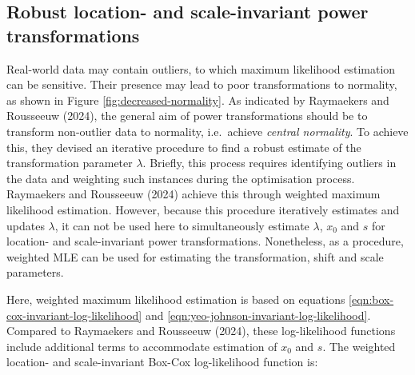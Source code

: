 \documentclass[
  a4paper,
]{article}
\begin{document}
\subsection{Robust location- and scale-invariant power
transformations}\label{robust-location--and-scale-invariant-power-transformations}

Real-world data may contain outliers, to which maximum likelihood
estimation can be sensitive. Their presence may lead to poor
transformations to normality, as shown in Figure
\ref{fig:decreased-normality}. As indicated by Raymaekers and Rousseeuw
(2024), the general aim of power transformations should be to transform
non-outlier data to normality, i.e.~achieve \emph{central normality}. To
achieve this, they devised an iterative procedure to find a robust
estimate of the transformation parameter \(\lambda\). Briefly, this
process requires identifying outliers in the data and weighting such
instances during the optimisation process. Raymaekers and Rousseeuw
(2024) achieve this through weighted maximum likelihood estimation.
However, because this procedure iteratively estimates and updates
\(\lambda\), it can not be used here to simultaneously estimate
\(\lambda\), \(x_0\) and \(s\) for location- and scale-invariant power
transformations. Nonetheless, as a procedure, weighted MLE can be used
for estimating the transformation, shift and scale parameters.

Here, weighted maximum likelihood estimation is based on equations
\ref{eqn:box-cox-invariant-log-likelihood} and
\ref{eqn:yeo-johnson-invariant-log-likelihood}. Compared to Raymaekers
and Rousseeuw (2024), these log-likelihood functions include additional
terms to accommodate estimation of \(x_0\) and \(s\). The weighted
location- and scale-invariant Box-Cox log-likelihood function is:
\end{document}
